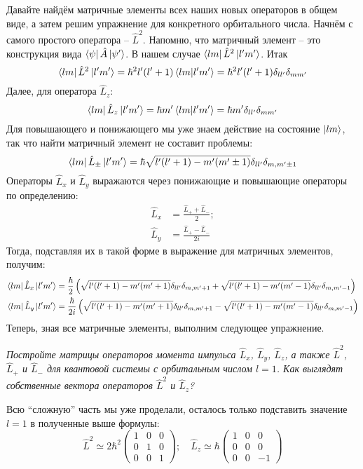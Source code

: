 Давайте найдём матричные элементы всех наших новых операторов в общем виде, а затем решим упражнение для конкретного орбитального числа. Начнём с самого простого оператора -- $\hat{L}^2$. Напомню, что матричный элемент -- это конструкция вида $\bra{\psi}\hat{A}\ket{\psi'}$. В нашем случае $\bra{lm}\hat{L}^2\ket{l'm'}$. Итак
\[
\bra{lm}\hat{L}^2\ket{l'm'} = \hbar^2l'(l'+1)\bra{lm}\ket{l'm'} = \hbar^2l'(l'+1)\delta_{ll'}\delta_{mm'}
\]
Далее, для оператора $\hat{L}_z$:
\[
\bra{lm}\hat{L}_z\ket{l'm'} = \hbar m'\bra{lm}\ket{l'm'} = \hbar m'\delta_{ll'}\delta_{mm'}
\]
Для повышающего и понижающего мы уже знаем действие на состояние $\ket{lm}$, так что найти матричный элемент не составит проблемы:
\[
    \bra{lm}\hat{L}_{\pm}\ket{l'm'} = \hbar\sqrt{l'(l'+1) - m'(m' \pm 1)}\delta_{ll'}\delta_{m,m'\pm 1}
\]
Операторы $\hat{L}_x$ и $\hat{L}_y$ выражаются через понижающие и повышающие операторы по определению:
\begin{align*}
    \hat{L}_x & = \frac{\hat{L}_+ + \hat{L}_-}{2};\\
    \hat{L}_y & = \frac{\hat{L}_+ - \hat{L}_-}{2i}
\end{align*}
Тогда, подставляя их в такой форме в выражение для матричных элементов, получим:
\begin{align*}
\bra{lm}\hat{L}_{x}\ket{l'm'} &= \frac{\hbar}{2}\left(\sqrt{l'(l'+1) - m'(m' + 1)}\delta_{ll'}\delta_{m,m' + 1} + \sqrt{l'(l'+1) - m'(m' - 1)}\delta_{ll'}\delta_{m,m' - 1}\right)\\
\bra{lm}\hat{L}_{y}\ket{l'm'} &= \frac{\hbar}{2i}\left(\sqrt{l'(l'+1) - m'(m' + 1)}\delta_{ll'}\delta_{m,m' + 1} - \sqrt{l'(l'+1) - m'(m' - 1)}\delta_{ll'}\delta_{m,m' - 1}\right)
\end{align*}
Теперь, зная все матричные элементы, выполним следующее упражнение.
\begin{center}
    \textit{Постройте матрицы операторов момента импульса $\hat{L}_x$, $\hat{L}_y$, $\hat{L}_z$, а также $\hat{L}^2$, $\hat{L}_+$ и $\hat{L}_-$ для квантовой системы с орбитальным числом $l = 1$. Как выглядят собственные вектора операторов $\hat{L}^2$ и $\hat{L}_z$?}
\end{center}

Всю ``сложную'' часть мы уже проделали, осталось только подставить значение $l = 1$ в полученные выше формулы:
\[
\hat{L}^2 \simeq 2\hbar^2 \begin{pmatrix}
    1 & 0 & 0 \\ 0 & 1 & 0 \\ 0 & 0 & 1 
\end{pmatrix}; \quad 
\hat{L}_z \simeq \hbar \begin{pmatrix}
    1 & 0 & 0 \\ 0 & 0 & 0 \\ 0 & 0 & -1
\end{pmatrix}
\]

